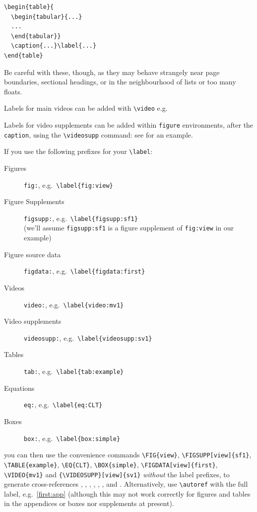 \documentclass[9pt]{crone}
\begin{document}
\begin{verbatim}
\begin{table}{
  \begin{tabular}{...}
  ...
  \end{tabular}}
  \caption{...}\label{...}
\end{table}
\end{verbatim}

Be careful with these, though, as they may behave strangely near page boundaries, sectional headings, or in the neighbourhood of lists or too many floats.

Labels for main videos can be added with \verb|\video| e.g.

\label{video:mv1}

Labels for video supplements can be added within \texttt{figure} environments, after the \texttt{caption}, using the \verb|\videosupp| command: see  for an example.

If you use the following prefixes for your \verb|\label|:
%
\begin{description}
\item[Figures] \texttt{fig:}, e.g.~\verb|\label{fig:view}|
\item[Figure Supplements] \texttt{figsupp:}, e.g.~\verb|\label{figsupp:sf1}|\\
(we'll assume \texttt{figsupp:sf1} is a figure supplement of \texttt{fig:view} in our example)
\item[Figure source data] \texttt{figdata:}, e.g.~\verb|\label{figdata:first}|
\item[Videos] \texttt{video:}, e.g.~\verb|\label{video:mv1}|
\item[Video supplements] \texttt{videosupp:}, e.g.~\verb|\label{videosupp:sv1}|
\item[Tables] \texttt{tab:}, e.g.~\verb|\label{tab:example}|
\item[Equations] \texttt{eq:}, e.g.~\verb|\label{eq:CLT}|
\item[Boxes] \texttt{box:}, e.g.~\verb|\label{box:simple}|
\end{description}
%
you can then use the convenience commands \verb|\FIG{view}|, \verb|\FIGSUPP[view]{sf1}|, \verb|\TABLE{example}|, \verb|\EQ{CLT}|, \verb|\BOX{simple}|, \verb|\FIGDATA[view]{first}|, \verb|\VIDEO{mv1}| and \verb|{\VIDEOSUPP}[view]{sv1}| \emph{without} the label prefixes, to generate cross-references , ,  , , , ,  and . Alternatively, use \verb|\autoref| with the full label, e.g.~\autoref{first:app} (although this may not work correctly for figures and tables in the appendices or boxes nor supplements at present).
\end{document}
